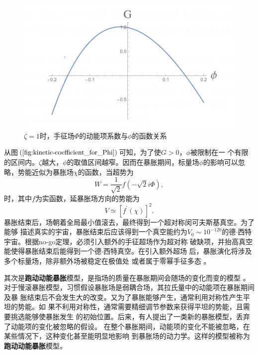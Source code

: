 \begin{figure}[!http]
  \centering
  \includegraphics{Img/kinetic_coefficient_for_Phi.png}
  \caption{$\zeta=1$时，手征场$\Phi$的动能项系数与$\phi$的函数关系}\label{fig:kinetic-coefficient_for_Phi}
\end{figure}

从图$(\ref{fig:kinetic-coefficient_for_Phi})$可知，为了使$G>0$，$\phi$被限制在一
个有限的区间内。$\zeta$越大，$\phi$的取值区间越窄。因而在暴胀期间，标量场$\phi$的影响可以忽略，势能近似为暴胀场$\chi$的函数，当超势为
\begin{equation}
  W = \frac{1}{\sqrt{2}} f(-\sqrt{2}i\Phi),
\end{equation}
时，其中$f$为实函数，延暴胀场方向的势能为
\begin{equation}
  V\simeq {\left[f^\prime(\chi)\right]}^2.
\end{equation}
暴胀结束后，场朝着全局最小值滚去，最终得到一个超对称闵可夫斯基真空。为了能够
描述真实的宇宙，暴胀结束后应该得到一个真空能约为$V_0 \sim
10^{-120}$的德$\cdot$西特宇宙。根据no-go定理，必须引入额外的手征超场作为超对称
破缺项，并抬高真空能使得暴胀结束后能得到一个德$\cdot$西特真空。在引入额外超场
后，暴胀演化将涉及多个标量场，除非额外场被稳定在极值处\citep{dudas2013strong} 
或者属于零幂手征多态
\citep{ferrara2014cosmology,kallosh2015inflation,dall2014sgoldstino,linde2015does}。

其次是\textbf{跑动动能暴胀}模型，是指场的质量在暴胀期间会随场的变化而变的模型
。对于慢滚暴胀模型，习惯假设暴胀场是弱耦合场，其拉氏量中的动能项在暴胀期间及暴
胀结束后不会发生大的改变。又为了暴胀能够产生，通常利用对称性产生平坦的势能。如
果不利用对称性，通常需要精细调节参数来获得平坦的势能，且需要挑选能够使暴胀发生
的初始位置。后来，有人提出了一类新的暴胀模型，丢弃了动能项的变化被忽略的假设。
在整个暴胀期间，动能项的变化不能被忽略，在某些情况下，这种变化甚至能明显地影响
到暴胀场的动力学。这样的模型被称为\textbf{跑动动能暴胀}模型。

